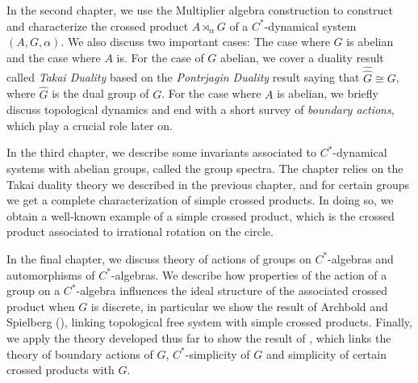 In the second chapter, we use the Multiplier algebra construction to construct and characterize the crossed product $A \rtimes_{\alpha} G$ of a $C^*$-dynamical system $(A,G,\alpha)$. We also discuss two important cases: The case where $G$ is abelian and the case where $A$ is. For the case of $G$ abelian, we cover a duality result called \textit{Takai Duality} based on the \textit{Pontrjagin Duality} result saying that $\hat{\hat G} \cong G$, where $\hat G$ is the dual group of $G$. For the case where $A$ is abelian, we briefly discuss topological dynamics and end with a short survey of \textit{boundary actions}, which play a crucial role later on.

In the third chapter, we describe some invariants associated to $C^*$-dynamical systems with abelian groups, called the group spectra. The chapter relies on the Takai duality theory we described in the previous chapter, and for certain groups we get a complete characterization of simple crossed products. In doing so, we obtain a well-known example of a simple crossed product, which is the crossed product associated to irrational rotation on the circle.

In the final chapter, we discuss theory of actions of groups on $C^*$-algebras and automorphisms of $C^*$-algebras. We describe how properties of the action of a group on a $C^*$-algebra influences the ideal structure of the associated crossed product when $G$ is discrete, in particular we show the result of Archbold and Spielberg (\cite{elliott1980some}), linking topological free system with simple crossed products. Finally, we apply the theory developed thus far to show the result of \cite{breuillard2017c}, which links the theory of boundary actions of $G$, $C^*$-simplicity of $G$ and simplicity of certain crossed products with $G$.
